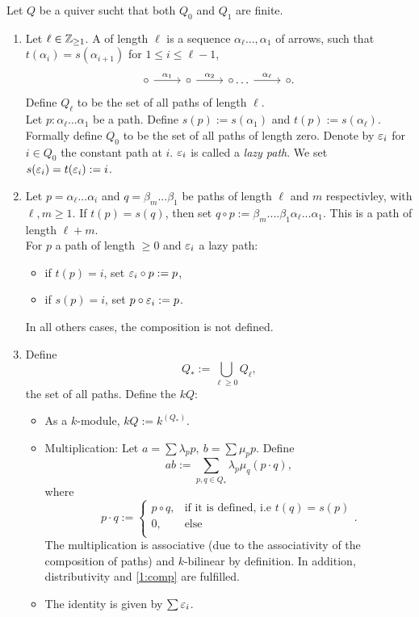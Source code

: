 \begin{defn}
	Let $Q$ be a quiver sucht that both $Q_0$ and $Q_1$ are finite.
	\begin{enumerate}
		\item Let $\ell\in \mathbb{Z}_{\geq 1}$. A  of length $\ell$ is a sequence $\alpha_{\ell}...,\alpha_1$ of arrows, such that $t(\alpha_i)=s(\alpha_{i+1})$ for $1\leq i \leq \ell-1$,
		\[
		\begin{tikzcd}
			\circ \ar{r}{\alpha_1}&\circ\ar{r}{\alpha_2}&\circ \hdots\ar{r}{\alpha_{\ell}}&\circ.
		\end{tikzcd}
		\]
		Define $Q_{\ell}$ to be the set of all paths of length $\ell$. \\
		Let $p:\alpha_{\ell}...\alpha_1$ be a path. Define $s(p):=s(\alpha_1)$ and $t(p):=s(\alpha_{\ell})$.\\
		Formally define $Q_0$ to be the set of all paths of length zero. Denote by $\varepsilon_i$ for $i\in Q_0$ the constant path at $i$. $\varepsilon_i$ is called a \emph{lazy path}. We set $s(\varepsilon_i)=t(\varepsilon_i):=i$.
		\item Let $p=\alpha_{\ell}...\alpha_i$ and $q=\beta_m...\beta_1$ be paths of length $\ell$ and $m$ respectivley, with $\ell,m\geq 1$. If $t(p)=s(q)$, then set $q\circ p:= \beta_m....\beta_1\alpha_{\ell}...\alpha_1$. This is a path of length $\ell+m$.\\
		For $p$ a path of length $\geq 0$ and $\varepsilon_i$ a lazy path:
		\begin{itemize}
			\item if $t(p)=i$, set $\varepsilon_i\circ p := p$,
			\item if $s(p)=i$, set $p\circ \varepsilon_i:= p$.
		\end{itemize}
		In all others cases, the composition is not defined.
	\item Define
	\[
	Q_{\ast}:= \bigcup_{\ell\geq 0}Q_{\ell},
	 \]
	 the set of all paths. Define the  $kQ$:
	 \begin{itemize}
		 \item As a $k$-module, $kQ:= k^{(Q_{\ast})}$.
		 \item Multiplication: Let $a=\sum \lambda_pp,~b=\sum\mu_p p$. Define
		 \[
		 ab:= \sum_{p,q\in Q_{\ast}}\lambda_p\mu_q(p\cdot q),
		\]
		where
		\[
		p\cdot q:= \begin{cases} p\circ q,&\text{if it is defined, i.e }t(q)=s(p)\\ 0,&\text{else}\\\end{cases}.
		\]
		The multiplication is associative (due to the associativity of the composition of paths) and $k$-bilinear by definition. In addition, distributivity and \eqref{1:comp} are fulfilled.
		\item The identity is given by $\sum \varepsilon_i$.
	 \end{itemize}
	\end{enumerate}
\end{defn}
